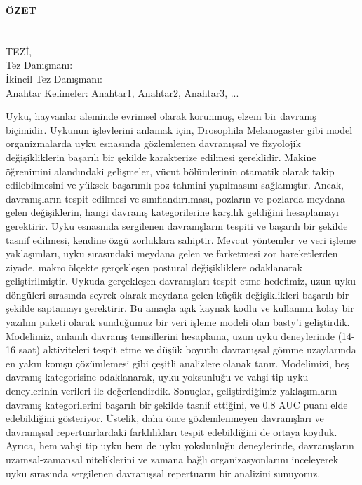 \clearpage\pagebreak
\begin{center}
	\MakeUppercase{\textbf{Özet}} \\ [3\baselineskip]
	\MakeUppercase{\thesistitletr} \\ [3\baselineskip]
	\MakeUppercase{\student} \\[\baselineskip]
	\MakeUppercase{\majortr \degreetr Tez\.{ı}, \monthtr~\year} \\[\baselineskip]
	Tez Danışmanı: \advisortr \\
	İkincil Tez Danışmanı: \coadvisortr \\
	[2\baselineskip]
	Anahtar Kelimeler: Anahtar1, Anahtar2, Anahtar3, ... \\[2\baselineskip]
\end{center}

\singlespacing

Uyku, hayvanlar aleminde evrimsel olarak korunmuş, elzem bir davranış biçimidir.
Uykunun işlevlerini anlamak için, Drosophila Melanogaster gibi model organizmalarda uyku esnasında gözlemlenen davranışsal ve fizyolojik değişikliklerin başarılı bir şekilde karakterize edilmesi gereklidir.
Makine öğrenimini alandındaki gelişmeler, vücut bölümlerinin otamatik olarak takip edilebilmesini ve yüksek başarımlı poz tahmini yapılmasını sağlamıştır.
Ancak, davranışların tespit edilmesi ve sınıflandırılması, pozların ve pozlarda meydana gelen değişiklerin, hangi davranış kategorilerine karşılık geldiğini hesaplamayı gerektirir.
Uyku esnasında sergilenen davranı\c{s}ların tespiti ve başarılı bir şekilde tasnif edilmesi, kendine özgü zorluklara sahiptir.
Mevcut yöntemler ve veri işleme yaklaşımları, uyku sırasındaki meydana gelen ve farketmesi zor hareketlerden ziyade, makro ölçekte gerçekleşen postural değişikliklere odaklanarak geliştirilmiştir.
Uykuda gerçekleşen davranışları tespit etme hedefimiz, uzun uyku döngüleri sırasında seyrek olarak meydana gelen küçük değişiklikleri başarılı bir şekilde saptamayı gerektirir.
Bu amaçla açık kaynak kodlu ve kullanımı kolay bir yazılım paketi olarak sunduğumuz bir veri işleme modeli olan basty’i geliştirdik.
Modelimiz, anlamlı davranış temsillerini hesaplama, uzun uyku deneylerinde (14-16 saat) aktiviteleri tespit etme ve düşük boyutlu davranışsal gömme uzaylarında en yakın komşu çözümlemesi gibi çeşitli analizlere olanak tanır.
Modelimizi, beş davranış kategorisine odaklanarak, uyku yoksunluğu ve vahşi tip uyku deneylerinin verileri ile değerlendirdik.
Sonuçlar, geliştirdiğimiz yaklaşımların davranış kategorilerini başarılı bir şekilde tasnif ettiğini, ve 0.8 AUC puanı elde edebildiğini gösteriyor.
Üstelik, daha önce gözlemlenmeyen davranışları ve davranışsal repertuarlardaki farklılıkları tespit edebildiğini de ortaya koyduk.
Ayrıca, hem vahşi tip uyku hem de uyku yokslunluğu deneylerinde, davranışların uzamsal-zamansal niteliklerini ve zamana bağlı organizasyonlarını inceleyerek uyku sırasında sergilenen davranışsal repertuarın bir analizini sunuyoruz.

\onehalfspacing